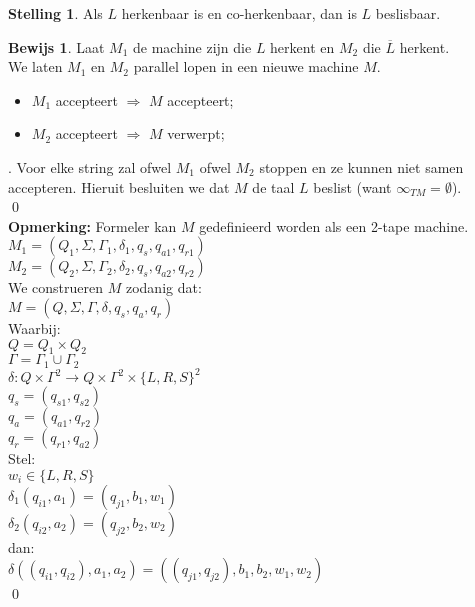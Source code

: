 \documentclass[12pt,a4paper]{article}
\theoremstyle{definition}
\newtheorem{stel}{Stelling}[section]
\newtheorem{bewijs}{Bewijs}[section]
\newcommand{\ra}{\ensuremath{\rightarrow}}
\begin{document}
	\begin{stel}
		Als $L$ herkenbaar is en co-herkenbaar, dan is $L$ beslisbaar.
		\begin{bewijs}
			Laat $M_1$ de machine zijn die $L$ herkent en $M_2$ die $\overline{L}$ herkent.\\
			We laten $M_1$ en $M_2$ parallel lopen in een nieuwe machine $M$. \begin{itemize}
				\item $M_1$ accepteert $\Rightarrow$ $M$ accepteert;
				\item $M_2$ accepteert $\Rightarrow$ $M$ verwerpt;
			\end{itemize}.
			Voor elke string zal ofwel $M_1$ ofwel $M_2$ stoppen en ze kunnen niet samen accepteren. Hieruit besluiten we dat $M$ de taal $L$ beslist (want $\infty_{TM} = \emptyset$).\\
			\qed\\
			\textbf{Opmerking:} Formeler kan $M$ gedefinieerd worden als een 2-tape machine.\\
			$M_1 = (Q_1,\Sigma,\Gamma_1,\delta_1,q_s,q_{a1},q_{r1})$\\
			$M_2 = (Q_2,\Sigma,\Gamma_2,\delta_2,q_s,q_{a2},q_{r2})$\\
			
			We construeren $M$ zodanig dat:\\
			$M = (Q,\Sigma,\Gamma, \delta, q_s, q_a, q_r)$\\
			
			Waarbij:\\
			$Q = Q_1 \times Q_2$\\
			$\Gamma = \Gamma_1 \cup \Gamma_2$\\
			$\delta: Q\times \Gamma^2 \ra Q\times \Gamma^2 \times \{L,R,S\}^2$\\
			$q_s = (q_{s1},q_{s2})$\\
			$q_a = (q_{a1},q_{r2})$\\
			$q_r = (q_{r1}, q_{a2})$\\
			
			Stel:\\
			$w_i\in \{L,R,S\}$\\
			$\delta_1(q_{i1},a_1) = (q_{j1},b_1,w_1)$\\
			$\delta_2(q_{i2},a_2) = (q_{j2},b_2,w_2)$\\
			
			dan:\\
			$\delta((q_{i1},q_{i2}),a_1,a_2) = ((q_{j1},q_{j2}),b_1,b_2,w_1,w_2)$\\
			\qed
		\end{bewijs}
	\end{stel}
\end{document}
